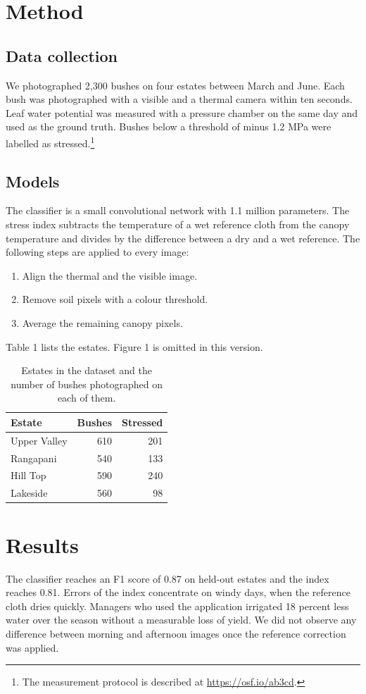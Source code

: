 \documentclass[10pt,twocolumn]{article}
\begin{document}
\section{Method}
\subsection{Data collection}
We photographed 2,300 bushes on four estates between March and June. Each bush was photographed with a visible and a thermal camera within ten seconds. Leaf water potential was measured with a pressure chamber on the same day and used as the ground truth. Bushes below a threshold of minus 1.2 MPa were labelled as stressed.\footnote{The measurement protocol is described at \url{https://osf.io/ab3cd}.}

\subsection{Models}
The classifier is a small convolutional network with 1.1 million parameters. The stress index subtracts the temperature of a wet reference cloth from the canopy temperature and divides by the difference between a dry and a wet reference. The following steps are applied to every image:
\begin{enumerate}
\item Align the thermal and the visible image.
\item Remove soil pixels with a colour threshold.
\item Average the remaining canopy pixels.
\end{enumerate}
Table 1 lists the estates. Figure 1 is omitted in this version.

\begin{table}[t]
\caption{Estates in the dataset and the number of bushes photographed on each of them.}
\centering
\begin{tabular}{lrr}
\toprule
Estate & Bushes & Stressed \\
\midrule
Upper Valley & 610 & 201 \\
Rangapani & 540 & 133 \\
Hill Top & 590 & 240 \\
Lakeside & 560 & 98 \\
\bottomrule
\end{tabular}
\end{table}

\section{Results}
The classifier reaches an F1 score of 0.87 on held-out estates and the index reaches 0.81. Errors of the index concentrate on windy days, when the reference cloth dries quickly. Managers who used the application irrigated 18 percent less water over the season without a measurable loss of yield. We did not observe any difference between morning and afternoon images once the reference correction was applied.
\end{document}
